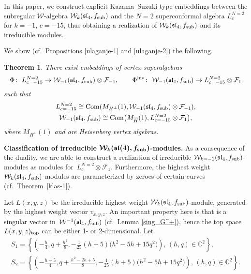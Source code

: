 \documentclass[pdftex]{sigma}
\numberwithin{equation}{section}
\newcommand{\C}{\mathbb C}
\newcommand{\F}{\mathcal F}
\newtheorem{Theorem}{Theorem}[section]
\begin{document}
 In this paper, we construct explicit Kazama--Suzuki type embeddings between the subregular $\mathcal{W}$-algebra $\mathcal{W}_k(\mathfrak{sl}_4, f_{\rm sub})$ and the $N = 2$ superconformal algebra $L^{N=2}_{c}$ for $k=-1$, $c=-15$, thus obtaining a realization of $\mathcal{W}_k(\mathfrak{sl}_4, f_{\rm sub})$ and its irreducible modules.

 We show (cf.\ Propositions \ref{ulaganje-1} and \ref{ulaganje-2}) the following.

 \begin{Theorem}
 	There exist embeddings of vertex superalgebras
 \[
 \Phi\colon\ L^{N=2}_{c=-15} \rightarrow \mathcal{W}_{-1}(\mathfrak{sl}_4, f_{\rm sub}) \otimes \F_{-1}, \qquad \Phi^{\rm inv} \colon\ \mathcal{W}_{-1}(\mathfrak{sl}_4, f_{\rm sub}) \rightarrow L^{N=2}_{c=-15} \otimes \F_{1}
 \]
 such that
 \begin{gather*}
 	L^{N=2}_{c=-15} \cong \operatorname{Com} (M_{H^{\perp}} (1), \mathcal{W}_{-1}(\mathfrak{sl}_4, f_{\rm sub}) \otimes \F_{-1}), \\
 	\mathcal{W}_{-1}(\mathfrak{sl}_4, f_{\rm sub}) \cong \operatorname{Com} \bigl(M_{\overline{H}}(1), L^{N=2}_{c=-15} \otimes \F_{1}\bigr),
 \end{gather*}
 where $M_{H^{\perp}}(1)$ and  are Heisenberg vertex algebras.
 \end{Theorem}

{\bf Classification of irreducible $\boldsymbol{\mathcal{W}_k(\mathfrak{sl}(4), f_{\rm sub})}$-modules.} As a consequence of the duality, we are able to construct a realization of irreducible $\mathcal{W}_{k=-1}(\mathfrak{sl}_4,\allowbreak f_{\rm sub})$-modules as modules for~${L^{N=2}_c \otimes \F_{1}}$. Furthermore, the highest weight $\mathcal{W}_k(\mathfrak{sl}_4, f_{\rm sub})$-modules are parameterized by zeroes of certain curves (cf.\ Theorem~\ref{klas-1}).

 Let $L(x,y,z)$ be the irreducible highest weight $\mathcal{W}_k(\mathfrak{sl}_4, f_{\rm sub})$-module, generated by the highest weight vector $v_{x,y,z}$.
An important property here is that  is a singular vector in~$\mathcal{W}^{-1}(\mathfrak{sl}_4,\allowbreak f_{\rm sub})$ (cf.\ Lemma \ref{sing_G^+}), hence the top space $L(x,y,z)_{\text{\rm top}}$ can be either 1- or 2-dimensional.
 Let
\begin{gather*}
 S_{1} = \left\{ \left(-\frac{h}{4}, q+ \frac{h^2}{8}, -\frac{1}{25} (h+5) \bigl(h^2 - 5h + 15 q^2\bigr)\right),\, (h,q) \in {\C} ^2\right\}, \\
 S_{2} = \left\{ \left(-\frac{h{-}5}{4}, q+ \frac{h^2 - 2 h + 5}{8}, -\frac{1}{25} (h+5) \bigl(h^2 - 5h + 15 q^2\bigr)\right),\, (h,q) \in {\C} ^2\right\} .
\end{gather*}
\end{document}
